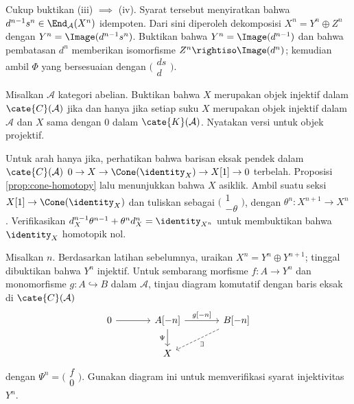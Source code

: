 \begin{Exercises}
	\begin{hint}
		Cukup buktikan (iii) $\implies$ (iv). Syarat tersebut menyiratkan bahwa
		$d^{n-1}s^n\in\End_{\mathcal{A}}(X^n)$ idempoten. Dari sini diperoleh
		dekomposisi $X^n=Y^n\oplus Z^n$ dengan
		$Y^n=\Image(d^{n-1}s^n)$. Buktikan bahwa
		$Y^n=\Image(d^{n-1})$ dan bahwa pembatasan $d^n$ memberikan isomorfisme
		$Z^n\rightiso\Image(d^n)$; kemudian ambil $\Phi$ yang bersesuaian
		dengan
		$\bigl(\begin{smallmatrix}ds\\d\end{smallmatrix}\bigr)$.
	\end{hint}

	\item Misalkan $\mathcal{A}$ kategori abelian. Buktikan bahwa $X$ merupakan
	objek injektif dalam $\cate{C}(\mathcal{A})$ jika dan hanya jika setiap
	suku $X$ merupakan objek injektif dalam $\mathcal{A}$ dan $X$ sama dengan
	$0$ dalam $\cate{K}(\mathcal{A})$. Nyatakan versi untuk objek projektif.

	\begin{hint}
		Untuk arah hanya jika, perhatikan bahwa barisan eksak pendek dalam
		$\cate{C}(\mathcal{A})$
		$0\to X\to\Cone(\identity_X)\to X[1]\to0$ terbelah. Proposisi
		\ref{prop:cone-homotopy} lalu menunjukkan bahwa $X$ asiklik.
		Ambil suatu seksi $X[1]\to\Cone(\identity_X)$ dan tuliskan sebagai
		$\bigl(\begin{smallmatrix}1\\-\theta\end{smallmatrix}\bigr)$, dengan
		$\theta^n:X^{n+1}\to X^n$. Verifikasikan
		$d_X^{n-1}\theta^{n-1}+\theta^nd_X^n=\identity_{X^n}$ untuk membuktikan
		bahwa $\identity_X$ homotopik nol.

		Misalkan $n$. Berdasarkan latihan sebelumnya, uraikan
		$X^n=Y^n\oplus Y^{n+1}$; tinggal dibuktikan bahwa $Y^n$ injektif.
		Untuk sembarang morfisme $f:A\to Y^n$ dan monomorfisme
		$g:A\hookrightarrow B$ dalam $\mathcal{A}$, tinjau diagram komutatif
		dengan baris eksak di $\cate{C}(\mathcal{A})$
		\[
		\begin{tikzcd}[column sep=large]
			0 \arrow[r] &
			{A[-n]} \arrow[r, "{g[-n]}"] \arrow[d, "\Psi"'] &
			{B[-n]} \arrow[dashed, ld, "\exists"] \\
			& X &
		\end{tikzcd}
		\]
		dengan $\Psi^n=\bigl(\begin{smallmatrix}f\\0\end{smallmatrix}\bigr)$.
		Gunakan diagram ini untuk memverifikasi syarat injektivitas $Y^n$.


\end{hint}
\end{Exercises}
